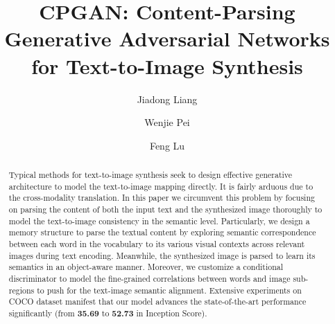 \documentclass[runningheads]{llncs}
\begin{document}
\pagestyle{headings}
\mainmatter
\def\ECCVSubNumber{2390}  

\title{CPGAN: Content-Parsing Generative Adversarial Networks for Text-to-Image Synthesis} 

\begin{comment}
\titlerunning{ECCV-20 submission ID \ECCVSubNumber} 
\authorrunning{ECCV-20 submission ID \ECCVSubNumber} 
\author{Anonymous ECCV submission}
\institute{Paper ID \ECCVSubNumber}
\end{comment}


\author{Jiadong Liang \and
Wenjie Pei \and
Feng Lu}

\renewcommand{\thefootnote}{\fnsymbol{footnote}}

\maketitle

\begin{abstract}
Typical methods for text-to-image synthesis seek to design effective generative architecture to model the text-to-image mapping directly. It is fairly arduous due to the cross-modality translation. In this paper we circumvent this problem by focusing on parsing the content of both the input text and the synthesized image thoroughly to model the text-to-image consistency in the semantic level. Particularly, we design a memory structure to parse the textual content by exploring semantic correspondence between each word in the vocabulary to its various visual contexts across relevant images during text encoding. Meanwhile, the synthesized image is parsed to learn its semantics in an object-aware manner. Moreover, we customize a conditional discriminator to model the fine-grained correlations between words and image sub-regions to push for the text-image semantic alignment.
Extensive experiments on COCO dataset manifest that our model advances the state-of-the-art performance significantly (from \textbf{35.69} to \textbf{52.73} in Inception Score). 
\end{abstract}
\end{document}
